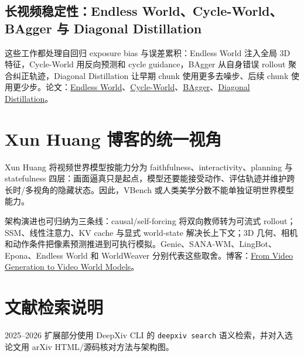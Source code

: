 \documentclass[UTF8,a4paper,12pt]{ctexart}
\begin{document}
\subsection{长视频稳定性：Endless World、Cycle-World、BAgger 与 Diagonal Distillation}
这些工作都处理自回归 exposure bias 与误差累积：Endless World 注入全局 3D 特征，Cycle-World 用反向预测和 cycle guidance，BAgger 从自身错误 rollout 聚合纠正轨迹，Diagonal Distillation 让早期 chunk 使用更多去噪步、后续 chunk 使用更少步。论文：\href{https://arxiv.org/abs/2512.12430}{Endless World}、\href{https://arxiv.org/abs/2607.11836}{Cycle-World}、\href{https://arxiv.org/abs/2512.12080}{BAgger}、\href{https://arxiv.org/abs/2603.09488}{Diagonal Distillation}。
\section{Xun Huang 博客的统一视角}
Xun Huang 将视频世界模型按能力分为 faithfulness、interactivity、planning 与 statefulness 四层：画面逼真只是起点，模型还要能接受动作、评估轨迹并维护跨长时/多视角的隐藏状态。因此，VBench 或人类美学分数不能单独证明世界模型能力。

架构演进也可归纳为三条线：causal/self-forcing 将双向教师转为可流式 rollout；SSM、线性注意力、KV cache 与显式 world-state 解决长上下文；3D 几何、相机和动作条件把像素预测推进到可执行模拟。Genie、SANA-WM、LingBot、Epona、Endless World 和 WorldWeaver 分别代表这些取舍。博客：\href{https://www.xunhuang.me/blogs/world_model.html}{From Video Generation to Video World Models}。
\section*{文献检索说明}
2025--2026 扩展部分使用 DeepXiv CLI 的 \texttt{deepxiv search} 语义检索，并对入选论文用 arXiv HTML/源码核对方法与架构图。
\end{document}
